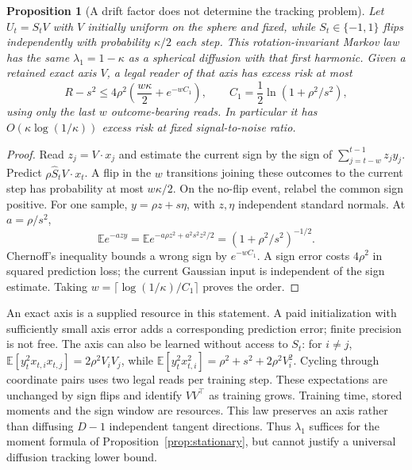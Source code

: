 \documentclass[12pt]{article}
\newtheorem{proposition}[theorem]{Proposition}
\theoremstyle{definition}
\newcommand{\E}{\mathbb E}
\begin{document}
\begin{proposition}[A drift factor does not determine the tracking problem]
\label{prop:flip-boundary}
Let $U_t=S_t V$ with $V$ initially uniform on the sphere and fixed,
while $S_t\in\{-1,1\}$ flips independently with probability $\kappa/2$
each step. This rotation-invariant Markov law has the same
$\lambda_1=1-\kappa$ as a spherical diffusion with that first harmonic.
Given a retained exact axis $V$, a legal reader of that axis has excess
risk at most
\begin{equation}\label{eq:flip-risk}
 R-s^2\le 4\rho^2\left(\frac{w\kappa}{2}
             +e^{-w C_1}\right),\qquad
 C_1=\frac12\ln(1+\rho^2/s^2),
\end{equation}
using only the last $w$ outcome-bearing reads. In particular it has
$O(\kappa\log(1/\kappa))$ excess risk at fixed signal-to-noise ratio.
\end{proposition}
\begin{proof}
Read $z_j=V\cdot x_j$ and estimate the current sign by the sign of
$\sum_{j=t-w}^{t-1}z_j y_j$. Predict
$\rho\widehat S_t V\cdot x_t$. A flip in the $w$ transitions joining
these outcomes to the current step has probability at most $w\kappa/2$.
On the no-flip event, relabel the common sign positive. For one sample,
$y=\rho z+s\eta$, with $z,\eta$ independent standard normals.
At $a=\rho/s^2$,
\[
 \E e^{-a z y}
 =\E e^{-a\rho z^2+a^2s^2z^2/2}
 =(1+\rho^2/s^2)^{-1/2}.
\]
Chernoff's inequality bounds a wrong sign by $e^{-wC_1}$.
A sign error costs $4\rho^2$ in squared prediction loss; the current
Gaussian input is independent of the sign estimate. Taking
$w=\lceil\log(1/\kappa)/C_1\rceil$ proves the order.
\end{proof}

An exact axis is a supplied resource in this statement. A paid
initialization with sufficiently small axis error adds a corresponding
prediction error; finite precision is not free. The axis can also be
learned without access to $S_t$: for $i\ne j$,
$\E[y_t^2x_{t,i}x_{t,j}]=2\rho^2 V_iV_j$, while
$\E[y_t^2x_{t,i}^2]=\rho^2+s^2+2\rho^2V_i^2$.
Cycling through coordinate pairs uses two legal reads per training
step. These expectations are unchanged by sign flips and identify
$VV^\top$ as training grows. Training time, stored moments and
the sign window are resources. This law preserves an axis rather than
diffusing $D-1$ independent tangent directions. Thus $\lambda_1$
suffices for the moment formula of Proposition~\ref{prop:stationary},
but cannot justify a universal diffusion tracking lower bound.
\end{document}

